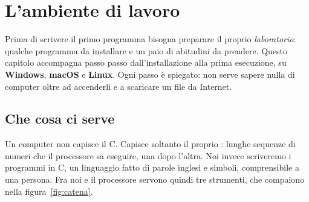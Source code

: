\chapter{L'ambiente di lavoro}
\label{chap:ambiente}

Prima di scrivere il primo programma bisogna preparare il proprio
\textit{laboratorio}: qualche programma da installare e un paio di abitudini
da prendere. Questo capitolo accompagna passo passo dall'installazione
alla prima esecuzione, su \textbf{Windows}, \textbf{macOS} e \textbf{Linux}.
Ogni passo è spiegato: non serve sapere nulla di computer oltre ad
accenderli e a scaricare un file da Internet.


\section{Che cosa ci serve}

Un computer non capisce il C. Capisce soltanto il proprio
: lunghe sequenze di numeri che il processore sa
eseguire, una dopo l'altra. Noi invece scriveremo i programmi in C, un
linguaggio fatto di parole inglesi e simboli, comprensibile a una persona.
Fra noi e il processore servono quindi tre strumenti, che compaiono nella
figura~\ref{fig:catena}.

